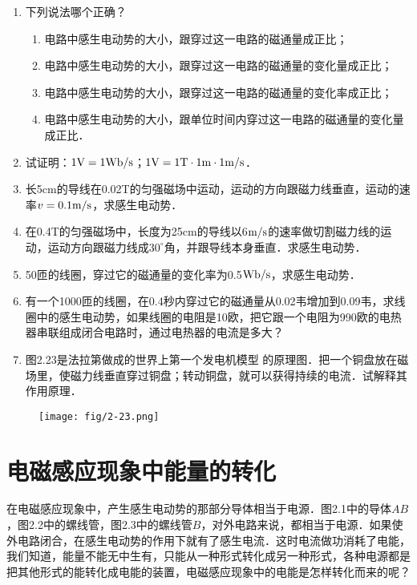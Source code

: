 \begin{enumerate}
    \item 下列说法哪个正确？
    \begin{enumerate}
        \item 电路中感生电动势的大小，跟穿过这一电路的磁通量成正比；
        \item 电路中感生电动势的大小，跟穿过这一电路的磁通量的变化量成正比；
        \item 电路中感生电动势的大小，跟穿过这一电路的磁通量的变化率成正比；
        \item 电路中感生电动势的大小，跟单位时间内穿过这一电路的磁通量的变化量成正比．
    \end{enumerate}
\item 试证明：$1{\rm V}=1{\rm Wb}/{\rm s}$；$1{\rm V}=1{\rm T}\cdot 1{\rm m}\cdot 1\text{m}/\text{s}$．
\item  长5cm的导线在0.02T的匀强磁场中运动，运动的方向跟磁力线垂直，运动的速率$v=0.1\text{m}/\text{s}$，求感生电动势．
\item 在0.4T的匀强磁场中，长度为25cm的导线以6$\text{m}/\text{s}$的速率做切割磁力线的运动，运动方向跟磁力线成$30^{\circ}$角，并跟导线本身垂直．求感生电动势．
\item 50匝的线圈，穿过它的磁通量的变化率为0.5${\rm Wb}/{\rm s}$，求感生电动势．
\item 有一个1000匝的线圈，在0.4秒内穿过它的磁通量从0.02韦增加到0.09韦，求线圈中的感生电动势，如果线圈的电阻是10欧，把它跟一个电阻为990欧的电热器串联组成闭合电路时，通过电热器的电流是多大？
\item 图2.23是法拉第做成的世界上第一个发电机模型
的原理图．把一个铜盘放在磁场里，使磁力线垂直穿过铜盘；转动铜盘，就可以获得持续的电流．试解释其作用原理．
\end{enumerate}

\begin{figure}[htp]\centering
\texttt{[image: fig/2-23.png]}
\caption{}
\end{figure}

\section{电磁感应现象中能量的转化}

在电磁感应现象中，产生感生电动势的那部分导体相当于电源．图2.1中的导体$AB$，图2.2中的螺线管，图2.3中的螺线管$B$，对外电路来说，都相当于电源．如果使外电路闭合，在感生电动势的作用下就有了感生电流．这时电流做功消耗了电能，我们知道，能量不能无中生有，只能从一种形式转化成另一种形式，各种电源都是把其他形式的能转化成电能的装置，电磁感应现象中的电能是怎样转化而来的呢？

